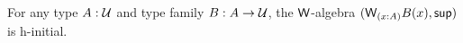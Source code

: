 \documentclass[hott-all.tex]{subfiles}
\begin{document}
% 
%
% 
\begin{thm}
For any type $A : \mathcal{U}$ and type family $B : A \to \mathcal{U}$, the $\mathsf{W}$-algebra $(\wtype{x:A}B(x), \supp)$ is h-initial.
\end{thm}
% 
\end{document}
